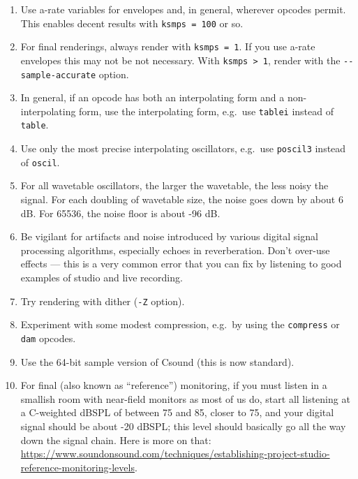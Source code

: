 \documentclass[english,11pt,letterpaper,onecolumn]{scrartcl}
\begin{document}
\begin{enumerate}
    \item Use a-rate variables for envelopes and, in general, wherever opcodes 
permit. This enables decent results with \texttt{ksmps = 100} or so.

\item For final renderings, always render with \texttt{ksmps = 1}. If you 
use a-rate envelopes this may not be not necessary. With \texttt{ksmps > 1}, render 
with the \lstinline{--sample-accurate} option.
	
	\item In general, if an opcode has both an interpolating form and a 
non-interpolating form, use the interpolating form, e.g.\ use \texttt{tablei} 
instead of \texttt{table}.
	
	\item Use only the most precise interpolating oscillators, e.g.\ use
\texttt{poscil3} instead of \texttt{oscil}.

	\item For all wavetable oscillators, the larger the wavetable, the less 
noisy the signal. For each doubling of wavetable size, 
the noise goes down by about 6 dB. For 65536, the noise floor is about -96 dB.

	\item Be vigilant for artifacts and noise introduced by various digital 
signal processing algorithms, especially echoes in reverberation. Don't 
over-use effects --- this is a very common error that you can fix by listening 
to good examples of studio and live recording.

	\item Try rendering with dither (\texttt{-Z} option).

	\item Experiment with some modest compression, e.g.\ by using the 
\texttt{compress} or \texttt{dam} opcodes.

  	\item Use the 64-bit sample version of Csound (this is now standard).
  	
  	\item For final (also known as ``reference'') monitoring, if you must 
  	listen in a smallish room with near-field monitors as most of us do, start all 
  	listening at a C-weighted dBSPL of between 75 and 85, closer to 75, and your digital 
  	signal should be about -20 dBSPL; this level should basically go all the way 
  	down the signal chain. Here is more on that: \url{https://www.soundonsound.com/techniques/establishing-project-studio-reference-monitoring-levels}.
\end{enumerate}
\end{document}
